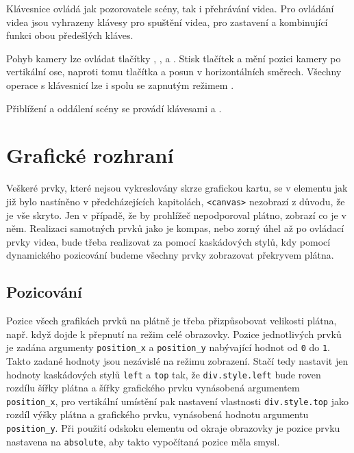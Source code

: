 Klávesnice ovládá jak pozorovatele scény, tak i přehrávání videa. Pro ovládání videa jsou vyhrazeny klávesy  pro spuštění videa,  pro zastavení a  kombinující funkci obou předešlých kláves.

Pohyb kamery lze ovládat tlačítky , ,   a  . Stisk tlačítek  a  mění pozici kamery po vertikální ose, naproti tomu tlačítka  a   posun v horizontálních směrech. Všechny operace s klávesnicí lze i spolu se zapnutým režimem  .

Přiblížení a oddálení scény se provádí klávesami \keystroke{+} a \keystroke{-}.

\newpage

\section{Grafické rozhraní}
Veškeré prvky, které nejsou vykreslovány skrze grafickou kartu, se v elementu jak již bylo nastíněno v předcházejících kapitolách, \texttt{<canvas>} nezobrazí z důvodu, že je vše skryto. Jen v případě, že by prohlížeč nepodporoval plátno, zobrazí co je v něm. Realizaci samotných prvků jako je kompas, nebo zorný úhel až po ovládací prvky videa, bude třeba realizovat za pomocí kaskádových stylů, kdy pomocí dynamického pozicování budeme všechny prvky zobrazovat překryvem plátna.

\subsection*{Pozicování}
Pozice všech grafikách prvků na plátně je třeba přizpůsobovat velikosti plátna, např. když dojde k přepnutí na režim celé obrazovky. Pozice jednotlivých prvků je zadána argumenty \texttt{position\_x} a \texttt{position\_y} nabývající hodnot od \texttt{0} do \texttt{1}. Takto zadané hodnoty jsou nezávislé na režimu zobrazení. Stačí tedy nastavit jen hodnoty kaskádových stylů \texttt{left} a \texttt{top} tak, že \texttt{div.style.left} bude roven rozdílu šířky plátna a šířky grafického prvku vynásobená argumentem \texttt{position\_x}, pro vertikální umístění pak nastavení vlastnosti \texttt{div.style.top} jako rozdíl výšky plátna a grafického prvku, vynásobená  hodnotu argumentu \texttt{position\_y}. Při použití odskoku elementu od okraje obrazovky je pozice prvku nastavena na \texttt{absolute}, aby takto vypočítaná pozice měla smysl. 



